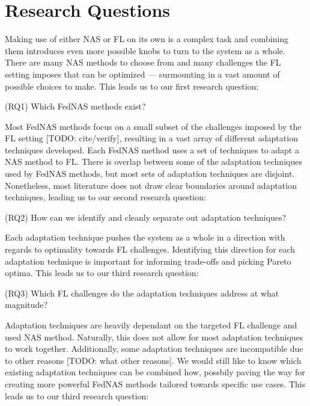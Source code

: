 
\section{Research Questions}


Making use of either NAS or FL on its own is a complex task and combining them introduces even more possible knobs to turn to the system as a whole. There are many NAS methods to choose from and many challenges the FL setting imposes that can be optimized — surmounting in a vast amount of possible choices to make. This leads us to our first research question:

(RQ1) Which FedNAS methods exist? 

Most FedNAS methods focus on a small subset of the challenges imposed by the FL setting [TODO: cite/verify], resulting in a vast array of different adaptation techniques developed. Each FedNAS method uses a set of techniques to adapt a NAS method to FL. There is overlap between some of the adaptation techniques used by FedNAS methods, but most sets of adaptation techniques are disjoint. Nonetheless, most literature does not draw clear boundaries around adaptation techniques, leading us to our second research question:

(RQ2) How can we identify and cleanly separate out adaptation techniques?

Each adaptation technique pushes the system as a whole in a direction with regards to optimality towards FL challenges. Identifying this direction for each adaptation technique is important for informing trade-offs and picking Pareto optima. This leads us to our third research question:

(RQ3) Which FL challenges do the adaptation techniques address at what magnitude?

Adaptation techniques are heavily dependant on the targeted FL challenge and used NAS method. Naturally, this does not allow for most adaptation techniques to work together. Additionally, some adaptation techniques are incompatible due to other reasons [TODO: what other reasons]. We would still like to know which existing adaptation techniques can be combined how, possbily paving the way for creating more powerful FedNAS methods tailored towards specific use cases. This leads us to our third research question:

